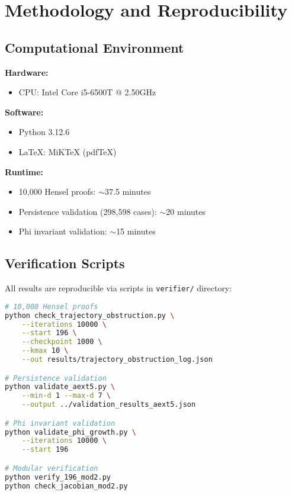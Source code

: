 \documentclass[11pt,a4paper]{article}
\theoremstyle{plain}
\theoremstyle{definition}
\begin{document}
\section{Methodology and Reproducibility}

\subsection{Computational Environment}

\textbf{Hardware:}
\begin{itemize}
\item CPU: Intel Core i5-6500T @ 2.50GHz
\end{itemize}

\textbf{Software:}
\begin{itemize}
\item Python 3.12.6
\item LaTeX: MiKTeX (pdfTeX)
\end{itemize}

\textbf{Runtime:}
\begin{itemize}
\item 10,000 Hensel proofs: $\sim$37.5 minutes
\item Persistence validation (298,598 cases): $\sim$20 minutes
\item Phi invariant validation: $\sim$15 minutes
\end{itemize}

\subsection{Verification Scripts}

All results are reproducible via scripts in \texttt{verifier/} directory:

\begin{lstlisting}[language=bash]
# 10,000 Hensel proofs
python check_trajectory_obstruction.py \
    --iterations 10000 \
    --start 196 \
    --checkpoint 1000 \
    --kmax 10 \
    --out results/trajectory_obstruction_log.json

# Persistence validation
python validate_aext5.py \
    --min-d 1 --max-d 7 \
    --output ../validation_results_aext5.json

# Phi invariant validation
python validate_phi_growth.py \
    --iterations 10000 \
    --start 196

# Modular verification
python verify_196_mod2.py
python check_jacobian_mod2.py
\end{lstlisting}
\end{document}
